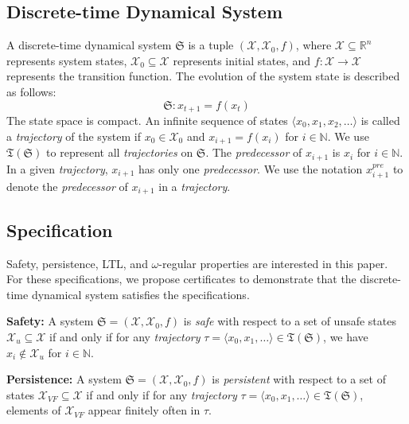 \subsection{Discrete-time Dynamical System}
\label{dtds}
A discrete-time dynamical system $\mathfrak{S}$ is a tuple $(\mathcal{X}, \mathcal{X}_0, f)$, where $\mathcal{X} \subseteq \mathbb{R}^n$ represents system states, $\mathcal{X}_{0} \subseteq \mathcal{X}$ represents initial states, and $f: \mathcal{X} \rightarrow \mathcal{X}$ represents the transition function. The evolution of the system state is described as follows:
\[
\mathfrak{S}: x_{t+1} = f(x_t)
\]
The state space is compact. An infinite sequence of states $\langle x_0, x_1, x_2, \dots \rangle$ is called a \emph{trajectory} of the system if $x_0 \in \mathcal{X}_0$ and $x_{i+1} = f(x_{i})$ for $i \in \mathbb{N}$. We use $\mathfrak{T}(\mathfrak{S})$ to represent all \emph{trajectories} on $\mathfrak{S}$. The \emph{predecessor} of \(x_{i+1}\) is \(x_i\) for \(i \in \mathbb{N}\). In a given \emph{trajectory}, \(x_{i+1}\) has only one \emph{predecessor}. We use the notation \(x_{i+1}^{pre}\) to denote the \emph{predecessor} of \(x_{i+1}\) in a \emph{trajectory}.
\subsection{Specification}
\label{specification123}
Safety, persistence, LTL, and $\omega$-regular properties are interested in this paper. For these specifications, we propose certificates to demonstrate that the discrete-time dynamical system satisfies the specifications.

\textbf{Safety:} A system $\mathfrak{S}=(\mathcal{X}, \mathcal{X}_0, f)$ is \emph{safe} with respect to a set of unsafe states $\mathcal{X}_u \subseteq \mathcal{X}$ if and only if for any \emph{trajectory} $\tau = \langle x_0, x_1, \dots \rangle \in \mathfrak{T}(\mathfrak{S})$, we have $x_i \not\in \mathcal{X}_u$ for $i \in \mathbb{N}$.

\textbf{Persistence:} A system $\mathfrak{S}=(\mathcal{X}, \mathcal{X}_0, f)$ is \emph{persistent} with respect to a set of states $\mathcal{X}_{VF} \subseteq \mathcal{X}$ if and only if for any \emph{trajectory} $\tau = \langle x_0, x_1, \dots \rangle \in \mathfrak{T}(\mathfrak{S})$, elements of $\mathcal{X}_{VF}$ appear finitely often in $\tau$.

